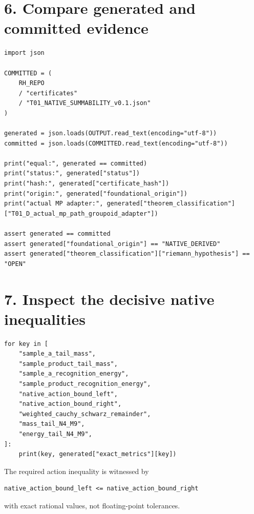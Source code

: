 \hypertarget{compare-generated-and-committed-evidence}{%
\section{6. Compare generated and committed evidence}\label{compare-generated-and-committed-evidence}}

\begin{verbatim}
import json

COMMITTED = (
    RH_REPO
    / "certificates"
    / "T01_NATIVE_SUMMABILITY_v0.1.json"
)

generated = json.loads(OUTPUT.read_text(encoding="utf-8"))
committed = json.loads(COMMITTED.read_text(encoding="utf-8"))

print("equal:", generated == committed)
print("status:", generated["status"])
print("hash:", generated["certificate_hash"])
print("origin:", generated["foundational_origin"])
print("actual MP adapter:", generated["theorem_classification"]["T01_D_actual_mp_path_groupoid_adapter"])

assert generated == committed
assert generated["foundational_origin"] == "NATIVE_DERIVED"
assert generated["theorem_classification"]["riemann_hypothesis"] == "OPEN"
\end{verbatim}

\hypertarget{inspect-the-decisive-native-inequalities}{%
\section{7. Inspect the decisive native inequalities}\label{inspect-the-decisive-native-inequalities}}

\begin{verbatim}
for key in [
    "sample_a_tail_mass",
    "sample_product_tail_mass",
    "sample_a_recognition_energy",
    "sample_product_recognition_energy",
    "native_action_bound_left",
    "native_action_bound_right",
    "weighted_cauchy_schwarz_remainder",
    "mass_tail_N4_M9",
    "energy_tail_N4_M9",
]:
    print(key, generated["exact_metrics"][key])
\end{verbatim}

The required action inequality is witnessed by

\begin{verbatim}
native_action_bound_left <= native_action_bound_right
\end{verbatim}

with exact rational values, not floating-point tolerances.


